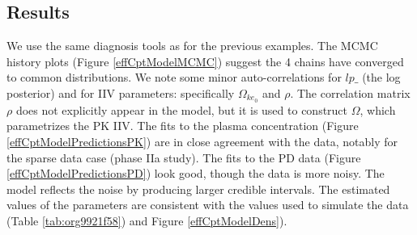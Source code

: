 \documentclass[11pt, reqno, oneside]{amsbook}
\numberwithin{equation}{chapter}
\numberwithin{figure}{chapter}
\numberwithin{table}{chapter}
\theoremstyle{remark}
\begin{document}
\subsection{Results}
\label{sec:orgf9b9fd2}
We use the same diagnosis tools as for the
previous examples. The MCMC history plots (Figure \ref{effCptModelMCMC}) suggest the 4 chains have converged to common
distributions. We note some minor auto-correlations for \(lp\_\) (the
log posterior) and for IIV parameters: specifically \(\Omega_{ke_0}\)
and \(\rho\). The correlation matrix \(\rho\) does not explicitly appear
in the model, but it is used to construct \(\Omega\), which parametrizes
the PK IIV. 
The fits to the plasma concentration
(Figure \ref{effCptModelPredictionsPK}) are in close agreement with
the data, notably for the sparse data case (phase IIa study). The fits
to the PD data (Figure \ref{effCptModelPredictionsPD}) look good,
though the data is more noisy. The model reflects the noise by
producing larger credible intervals. The estimated values of the
parameters are consistent with the values used to simulate the data
(Table \ref{tab:org9921f58}) and Figure \ref{effCptModelDens}).
\end{document}
